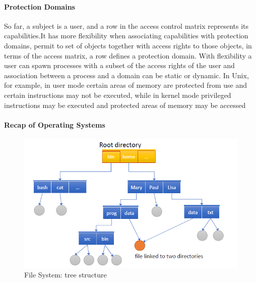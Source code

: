 \documentclass{article}
\begin{document}
                        \paragraph{Protection Domains} So far, a subject is a user, and a row in the access control
                        matrix represents its capabilities.It has more flexibility when associating capabilities with
                        protection domains, permit to set of objects together with access rights to those objects, in terms of the access matrix, a row defines a protection
                        domain. With flexibility a user can spawn processes with a subset of the access rights
                        of the user and association between a process and a domain can be static or
                        dynamic. In Unix, for example, in user mode certain areas of memory are protected from
                        use and certain instructions may not be executed,
                        while in kernel mode privileged instructions may be executed and
                        protected areas of memory may be accessed 
                        \newpage
                        \paragraph{Recap of  Operating Systems}
                            \begin{figure}[h]
                                \begin{center}
                                    \includegraphics[scale=0.5]{../immagini/unix_file_system.png}
                                \end{center}
                                \caption{File System: tree structure}
                            \end{figure}
                            
\end{document}

